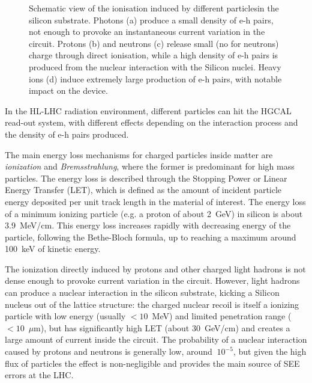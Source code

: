 \begin{figure}
    \hspace{0.1cm}
    \caption{Schematic view of the ionisation induced by different particlesin the silicon substrate. Photons (a) produce a small density of e-h pairs, not enough to provoke an instantaneous current variation in the circuit. Protons (b) and neutrons (c) release small (no for neutrons) charge through direct ionisation, while a high density of e-h pairs is produced from the nuclear interaction with the Silicon nuclei. Heavy ions (d) induce extremely large production of e-h pairs, with notable impact on the device.}
    \label{fig:SEE_ParticleInteraction}
\end{figure}

In the HL-LHC radiation environment, different particles can hit the HGCAL read-out system, with different effects depending on the interaction process and the density of e-h pairs produced. 

\bigbreak

The main energy loss mechanisms for charged particles inside matter are \textit{ionization} and \textit{Bremsstrahlung}, where the former is predominant for high mass particles. 
The energy loss is described through the Stopping Power or Linear Energy Transfer (LET), which is defined as the amount of incident particle energy deposited per unit track length in the material of interest.
The energy loss of a minimum ionizing particle (e.g. a proton of about 2~GeV) in silicon is about 3.9~MeV/cm. This energy loss increases rapidly with decreasing energy of the particle, following the Bethe-Bloch formula, up to reaching a maximum around 100~keV of kinetic energy.

The ionization directly induced by protons and other charged light hadrons is not dense enough to provoke current variation in the circuit. 
However, light hadrons can produce a nuclear interaction in the silicon substrate, kicking a Silicon nucleus out of the lattice structure: the charged nuclear recoil is itself a ionizing particle with low energy (usually $<10$~MeV) and limited penetration range ($<10$~$\mu$m), but has significantly high LET (about 30~GeV/cm) and creates a large amount of current inside the circuit.
The probability of a nuclear interaction caused by protons and neutrons is generally low, around $~10^{-5}$, but given the high flux of particles the effect is non-negligible and provides the main source of SEE errors at the LHC.

